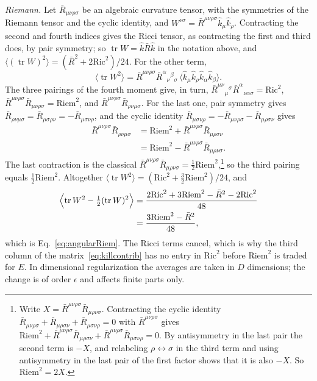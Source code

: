 \documentclass[a4paper,11pt]{article}
\newcommand{\Ric}{\mathrm{Ric}}
\newcommand{\Riem}{\mathrm{Riem}}
\begin{document}
\textit{Riemann.} Let $\bar R_{\mu\nu\rho\sigma}$ be an algebraic curvature tensor, with the symmetries of the Riemann tensor and the cyclic identity, and $W^{\nu\sigma}=\bar R^{\mu\nu\rho\sigma}\hat k_\mu\hat k_\rho$. Contracting the second and fourth indices gives the Ricci tensor, as contracting the first and third does, by pair symmetry; so $\operatorname{tr}W=\hat k\bar R\hat k$ in the notation above, and $\langle(\operatorname{tr}W)^2\rangle=(\bar R^2+2\Ric^2)/24$. For the other term,
\[
\langle\operatorname{tr}W^2\rangle=\bar R^{\mu\nu\rho\sigma}\bar R^{\alpha}{}_{\nu}{}^{\beta}{}_{\sigma}\,\bigl\langle\hat k_\mu\hat k_\rho\hat k_\alpha\hat k_\beta\bigr\rangle .
\]
The three pairings of the fourth moment give, in turn, $\bar R^{\mu\nu}{}_{\mu}{}^{\sigma}\bar R^{\alpha}{}_{\nu\alpha\sigma}=\Ric^2$, $\bar R^{\mu\nu\rho\sigma}\bar R_{\mu\nu\rho\sigma}=\Riem^2$, and $\bar R^{\mu\nu\rho\sigma}\bar R_{\rho\nu\mu\sigma}$. For the last one, pair symmetry gives $\bar R_{\rho\nu\mu\sigma}=\bar R_{\mu\sigma\rho\nu}=-\bar R_{\mu\sigma\nu\rho}$, and the cyclic identity $\bar R_{\mu\sigma\nu\rho}=-\bar R_{\mu\nu\rho\sigma}-\bar R_{\mu\rho\sigma\nu}$ gives
\begin{align*}
\bar R^{\mu\nu\rho\sigma}\bar R_{\rho\nu\mu\sigma}&=\Riem^2+\bar R^{\mu\nu\rho\sigma}\bar R_{\mu\rho\sigma\nu}\\
&=\Riem^2-\bar R^{\mu\nu\rho\sigma}\bar R_{\mu\rho\nu\sigma}.
\end{align*}
The last contraction is the classical $\bar R^{\mu\nu\rho\sigma}\bar R_{\mu\rho\nu\sigma}=\frac12\Riem^2$,\footnote{Write $X=\bar R^{\mu\nu\rho\sigma}\bar R_{\mu\rho\nu\sigma}$. Contracting the cyclic identity $\bar R_{\mu\nu\rho\sigma}+\bar R_{\mu\rho\sigma\nu}+\bar R_{\mu\sigma\nu\rho}=0$ with $\bar R^{\mu\nu\rho\sigma}$ gives $\Riem^2+\bar R^{\mu\nu\rho\sigma}\bar R_{\mu\rho\sigma\nu}+\bar R^{\mu\nu\rho\sigma}\bar R_{\mu\sigma\nu\rho}=0$. By antisymmetry in the last pair the second term is $-X$, and relabeling $\rho\leftrightarrow\sigma$ in the third term and using antisymmetry in the last pair of the first factor shows that it is also $-X$. So $\Riem^2=2X$.} so the third pairing equals $\frac12\Riem^2$. Altogether $\langle\operatorname{tr}W^2\rangle=(\Ric^2+\frac32\Riem^2)/24$, and
\begin{align*}
\Bigl\langle\operatorname{tr}W^2-\tfrac12(\operatorname{tr}W)^2\Bigr\rangle&=\frac{2\Ric^2+3\Riem^2-\bar R^2-2\Ric^2}{48}\\
&=\frac{3\Riem^2-\bar R^2}{48},
\end{align*}
which is Eq.~\eqref{eq:angularRiem}. The Ricci terms cancel, which is why the third column of the matrix~\eqref{eq:killcontrib} has no entry in $\Ric^2$ before $\Riem^2$ is traded for $E$. In dimensional regularization the averages are taken in $D$ dimensions; the change is of order $\epsilon$ and affects finite parts only.
\end{document}
